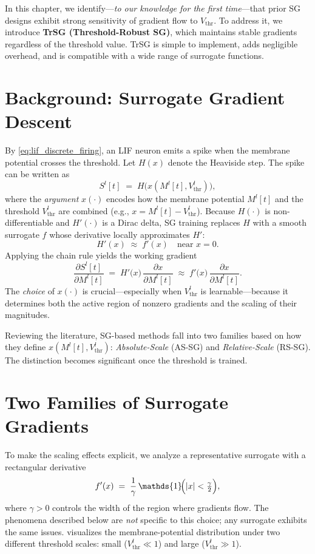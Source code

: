 In this chapter, we identify—\emph{to our knowledge for the first time}—that prior SG designs exhibit strong sensitivity of gradient flow to $V_{\text{thr}}$. To address it, we introduce \textbf{TrSG (Threshold-Robust SG)}, which maintains stable gradients regardless of the threshold value. TrSG is simple to implement, adds negligible overhead, and is compatible with a wide range of surrogate functions.

\section{Background: Surrogate Gradient Descent}
\label{sec:trsg_background}

By \cref{eq:lif_discrete_firing}, an LIF neuron emits a spike when the membrane potential crosses the threshold. Let $H(x)$ denote the Heaviside step. The spike can be written as
\[
S^{l}[t] \;=\; H\!\bigl(x(M^{l}[t],V^{l}_{\text{thr}})\bigr),
\]
where the \emph{argument} $x(\cdot)$ encodes how the membrane potential $M^{l}[t]$ and the threshold $V^{l}_{\text{thr}}$ are combined (e.g., $x = M^{l}[t]-V^{l}_{\text{thr}}$). Because $H(\cdot)$ is non-differentiable and $H'(\cdot)$ is a Dirac delta, SG training replaces $H$ with a smooth surrogate $f$ whose derivative locally approximates $H'$:
\[
H'(x)\;\approx\; f'(x)\quad\text{near }x=0.
\]
Applying the chain rule yields the working gradient
\begin{equation}
\label{eq:def_of_srgd}
\frac{\partial S^{l}[t]}{\partial M^{l}[t]}
\;=\;
H'\!\bigl(x\bigr)\,\frac{\partial x}{\partial M^{l}[t]}
\;\approx\;
f'\!\bigl(x\bigr)\,\frac{\partial x}{\partial M^{l}[t]}.
\end{equation}
The \emph{choice} of $x(\cdot)$ is crucial—especially when $V^{l}_{\text{thr}}$ is learnable—because it determines both the active region of nonzero gradients and the scaling of their magnitudes.

Reviewing the literature, SG-based methods fall into two families based on how they define $x(M^{l}[t],V^{l}_{\text{thr}})$: \emph{Absolute-Scale} (AS-SG) and \emph{Relative-Scale} (RS-SG). The distinction becomes significant once the threshold is trained.

\section{Two Families of Surrogate Gradients}
\label{sec:trsg_two_families}

To make the scaling effects explicit, we analyze a representative surrogate with a rectangular derivative
\[
f'(x) \;=\; \frac{1}{\gamma}\,\mathds{1}\!\Bigl(|x|<\tfrac{\gamma}{2}\Bigr),
\]
where $\gamma>0$ controls the width of the region where gradients flow. The phenomena described below are \emph{not} specific to this choice; any surrogate exhibits the same issues.  visualizes the membrane-potential distribution under two different threshold scales: small ($V_{\text{thr}}^{l}\!\ll\!1$) and large ($V_{\text{thr}}^{l}\!\gg\!1$).


